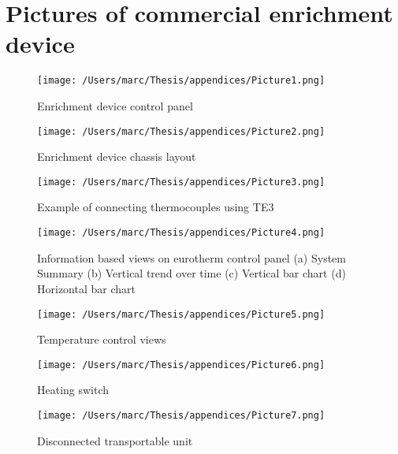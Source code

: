 \section*{Pictures of commercial enrichment device}

\begin{figure}[H]
    \texttt{[image: /Users/marc/Thesis/appendices/Picture1.png]}
    \caption{Enrichment device control panel}
  \end{figure}

  \begin{figure}[H]
    \texttt{[image: /Users/marc/Thesis/appendices/Picture2.png]}
    \caption{Enrichment device chassis layout}
  \end{figure}

  \begin{figure}[H]
    \texttt{[image: /Users/marc/Thesis/appendices/Picture3.png]}
    \caption{Example of connecting thermocouples using TE3}
  \end{figure}

  \begin{figure}[H]
    \texttt{[image: /Users/marc/Thesis/appendices/Picture4.png]}
    \caption{Information based views on eurotherm control panel (a) System Summary (b) Vertical trend over time (c) Vertical bar chart (d) Horizontal bar chart}
  \end{figure}

  \begin{figure}[H]
    \texttt{[image: /Users/marc/Thesis/appendices/Picture5.png]}
    \caption{Temperature control views}
  \end{figure}

  \begin{figure}[H]
    \texttt{[image: /Users/marc/Thesis/appendices/Picture6.png]}
    \caption{Heating switch}
  \end{figure}

  \begin{figure}[H]
    \texttt{[image: /Users/marc/Thesis/appendices/Picture7.png]}
    \caption{Disconnected transportable unit}
  \end{figure}

  
  